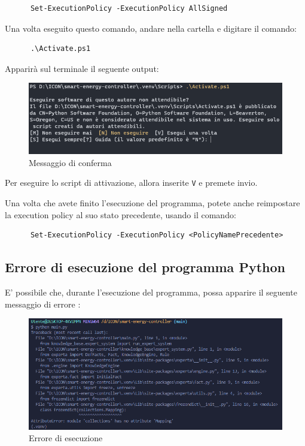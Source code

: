 \documentclass[12pt, letterpaper]{article}
\begin{document}
\begin{verbatim}
      Set-ExecutionPolicy -ExecutionPolicy AllSigned
\end{verbatim}

Una volta eseguito questo comando, andare nella cartella  e digitare il
comando:

\begin{verbatim}
      .\Activate.ps1
\end{verbatim}

Apparirà sul terminale il seguente output: \\

\begin{figure}[h]
      \centering
      \includegraphics[scale=0.6]{terminal-message.png}
      \caption{Messaggio di conferma}
\end{figure}

Per eseguire lo script di attivazione, allora inserite \texttt{V} e
premete invio. \\ \break

\noindent Una volta che avete finito l'esecuzione del programma, potete anche reimpostare
la execution policy al suo stato precedente, usando il comando:

\begin{verbatim}
      Set-ExecutionPolicy -ExecutionPolicy <PolicyNamePrecedente>
\end{verbatim}


\subsection{Errore di esecuzione del programma Python}
\label{sec:python-error}

E' possibile che, durante l'esecuzione del programma, possa apparire il seguente
messaggio di errore \cite{python-mapping-problem}: \\ \pagebreak

\begin{figure}[h]
      \centering
      \includegraphics[scale=0.55]{errore-python.png}
      \caption{Errore di esecuzione}
\end{figure}
\end{document}
